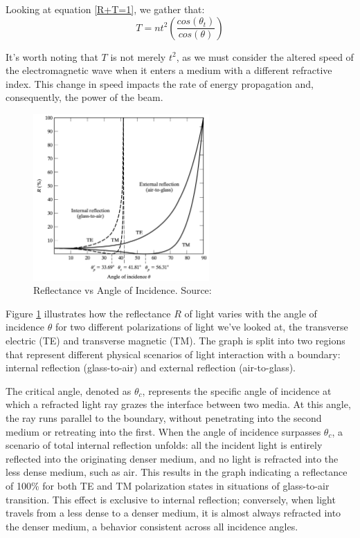 Looking at equation \ref{R+T=1}, we gather that:
\begin{equation} \label{definition of T}
T =  n t^2 \left(\frac{cos(\theta_t)}{cos(\theta)} \right)
\end{equation}

It's worth noting that $T$ is not merely $t^2$, as we must consider the altered speed of the electromagnetic wave when it enters a medium with a different refractive index. This change in speed impacts the rate of energy propagation and, consequently, the power of the beam.

\begin{figure}[ht!]
  \centering
  \includegraphics[width=0.6\textwidth]{Chapters/Figures/Chapter 2 Figures/Reflectance vs Angle of Incidence.jpg}
  \caption[Reflectance vs Angle of Incidence]{Reflectance vs Angle of Incidence. Source: \cite{pedrotti_introduction_2007}}
  \label{fig: R vs Theta}
\end{figure}

Figure \ref{fig: R vs Theta} illustrates how the reflectance $R$ of light varies with the angle of incidence $\theta$ for two different polarizations of light we've looked at, the transverse electric (TE) and transverse magnetic (TM). The graph is split into two regions that represent different physical scenarios of light interaction with a boundary: internal reflection (glass-to-air) and external reflection (air-to-glass).

The critical angle, denoted as $\theta_c$, represents the specific angle of incidence at which a refracted light ray grazes the interface between two media. At this angle, the ray runs parallel to the boundary, without penetrating into the second medium or retreating into the first. When the angle of incidence surpasses $\theta_c$, a scenario of total internal reflection unfolds: all the incident light is entirely reflected into the originating denser medium, and no light is refracted into the less dense medium, such as air. This results in the graph indicating a reflectance of 100\% for both TE and TM polarization states in situations of glass-to-air transition. This effect is exclusive to internal reflection; conversely, when light travels from a less dense to a denser medium, it is almost always refracted into the denser medium, a behavior consistent across all incidence angles.


